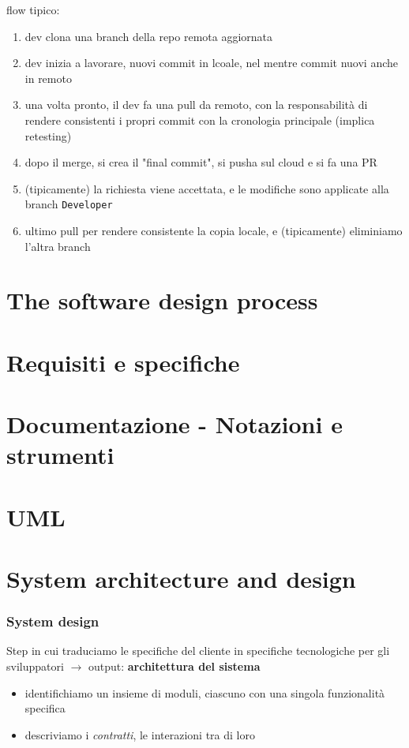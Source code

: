 flow tipico:
\begin{enumerate}
  \item dev clona una branch della repo remota aggiornata
  \item dev inizia a lavorare, nuovi commit in lcoale, nel mentre commit nuovi anche in remoto
  \item una volta pronto, il dev fa una pull da remoto, con la responsabilit\`a di rendere consistenti i propri commit con la cronologia principale (implica retesting)
  \item dopo il merge, si crea il "final commit", si pusha sul cloud e si fa una PR
  \item (tipicamente) la richiesta viene accettata, e le modifiche sono applicate alla branch \lstinline|Developer|
  \item ultimo pull per rendere consistente la copia locale, e (tipicamente) eliminiamo l'altra branch
\end{enumerate}

\newpage
\part{The software design process}

\newpage
\part{Requisiti e specifiche}

\newpage
\part{Documentazione - Notazioni e strumenti}

\newpage
\part{UML}

\newpage
\part{System architecture and design}

\section{System design}

Step in cui traduciamo le specifiche del cliente in specifiche tecnologiche per gli sviluppatori $\rightarrow$ output: \textbf{architettura del sistema}
\begin{itemize}
  \item identifichiamo un insieme di moduli, ciascuno con una singola funzionalit\`a specifica
  \item descriviamo i \textit{contratti}, le interazioni tra di loro
\end{itemize}

